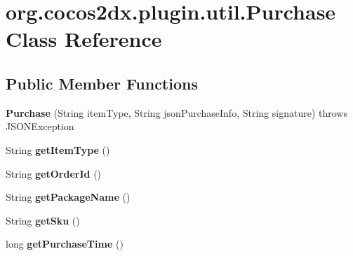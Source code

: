 \hypertarget{classorg_1_1cocos2dx_1_1plugin_1_1util_1_1Purchase}{}\section{org.\+cocos2dx.\+plugin.\+util.\+Purchase Class Reference}
\label{classorg_1_1cocos2dx_1_1plugin_1_1util_1_1Purchase}
\subsection*{Public Member Functions}
\begin{DoxyCompactItemize}
\item 
\mbox{\label{classorg_1_1cocos2dx_1_1plugin_1_1util_1_1Purchase_af70f0895af47f44b72bd05e966f16cdd}} 
{\bfseries Purchase} (String item\+Type, String json\+Purchase\+Info, String signature)  throws J\+S\+O\+N\+Exception 
\item 
\mbox{\label{classorg_1_1cocos2dx_1_1plugin_1_1util_1_1Purchase_ac9bfbe69b2423d6955a2a0787d0fae9b}} 
String {\bfseries get\+Item\+Type} ()
\item 
\mbox{\label{classorg_1_1cocos2dx_1_1plugin_1_1util_1_1Purchase_a6431766d50c1615eaacda7694e90dbcd}} 
String {\bfseries get\+Order\+Id} ()
\item 
\mbox{\label{classorg_1_1cocos2dx_1_1plugin_1_1util_1_1Purchase_a48eab61a46ce0e9f24075e5711ecda40}} 
String {\bfseries get\+Package\+Name} ()
\item 
\mbox{\label{classorg_1_1cocos2dx_1_1plugin_1_1util_1_1Purchase_aec87316dd071c5fd0db169dbd3d13f74}} 
String {\bfseries get\+Sku} ()
\item 
\mbox{\label{classorg_1_1cocos2dx_1_1plugin_1_1util_1_1Purchase_a3c172da2352cc004aeeaac4f1c90e325}} 
long {\bfseries get\+Purchase\+Time} ()
\item 
\mbox{\label{classorg_1_1cocos2dx_1_1plugin_1_1util_1_1Purchase_aad4cc9ca4a0b519b687b7fc8f18ce006}} 

\end{DoxyCompactItemize}
